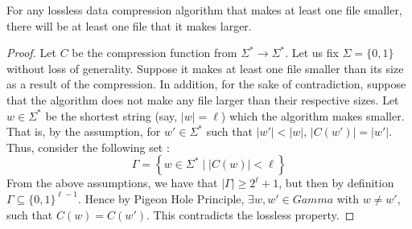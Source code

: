 \begin{theorem}
For any lossless data compression algorithm that makes at least one file smaller, there will be at least one file that it makes larger.
\end{theorem}
\begin{proof}
Let $C$ be the compression function from $\Sigma^* \to \Sigma^*$. Let us fix $\Sigma = \{0,1\}$ without loss of generality.
Suppose it makes at least one file smaller than its size as a result of the compression. In addition, for the sake of contradiction, suppose that the algorithm does not make any file larger than their respective sizes.  Let $w \in \Sigma^*$ be the shortest string (say, $|w| = \ell$) which the algorithm makes smaller. That is, by the assumption, for $w' \in \Sigma^*$ such that $|w'| < |w|$, $|C(w')| = |w'|$. Thus, consider the following set :
$$ \Gamma = \left\{ w \in \Sigma^* \mid | C(w) |  < \ell \right\} $$
From the above assumptions, we have that $|\Gamma| \ge 2^\ell+1$, but then by definition $\Gamma \subseteq \{0,1\}^{\ell-1}$. Hence by Pigeon Hole Principle, $\exists w,w' \in Gamma$ with $w \ne w'$, such that $C(w) = C(w')$. This contradicts the lossless property.
\end{proof}
%
%
%
%
%
%
%
